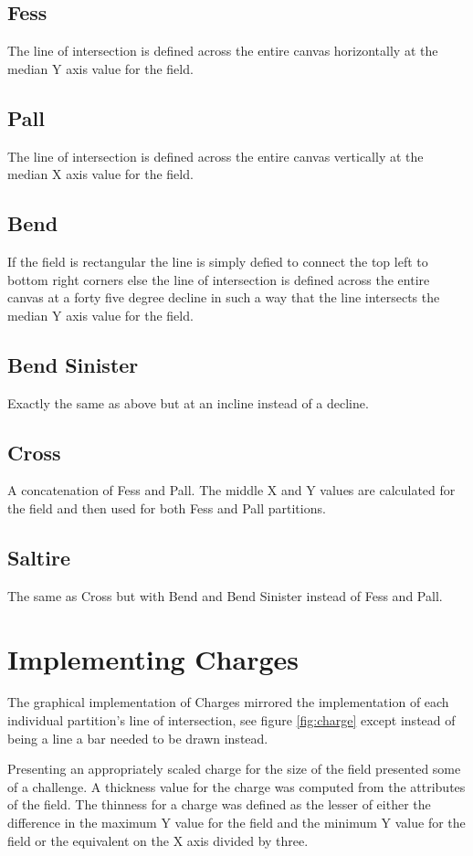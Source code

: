 \subsection{Fess}
The line of intersection is defined across the entire canvas horizontally at the median Y axis value for the field. 
\subsection{Pall}
The line of intersection is defined across the entire canvas vertically at the median X axis value for the field. 
\subsection{Bend}
If the field is rectangular the line is simply defied to connect the top left to bottom right corners else the line of intersection is defined across the entire canvas at a forty five degree decline in such a way that the line intersects the median Y axis value for the field.
\subsection{Bend Sinister}
Exactly the same as above but at an incline instead of a decline.
\subsection{Cross}
A concatenation of Fess and Pall. The middle X and Y values are calculated for the field and then used for both Fess and Pall partitions.
\subsection{Saltire}
The same as Cross but with Bend and Bend Sinister instead of Fess and Pall.

\section{Implementing Charges}
The graphical implementation of Charges mirrored the implementation of each individual partition's line of intersection, see figure \ref{fig:charge} except instead of being a line a bar needed to be drawn instead.  

Presenting an appropriately scaled charge for the size of the field presented some of a challenge.  A thickness value for the charge was computed from the attributes of the field.  The thinness for a charge was defined as the lesser of either the difference in the maximum Y value for the field and the minimum Y value for the field or the equivalent on the X axis divided by three. 


